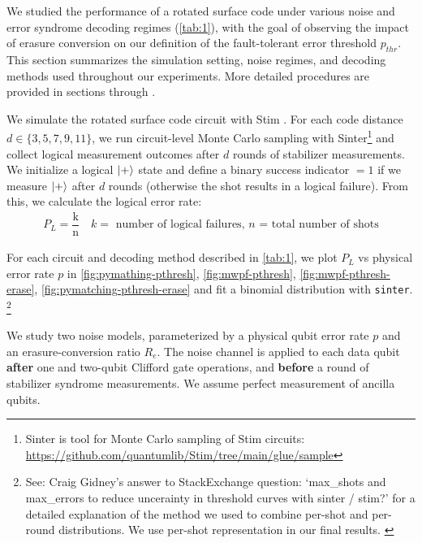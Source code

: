 \documentclass[11pt, notitlepage, letterpaper]{article}
\begin{document}
We studied the performance of a rotated surface code under various noise and error syndrome decoding regimes (\autoref{tab:1}), with the goal of observing the impact of erasure conversion on our definition of the fault-tolerant error threshold $p_{thr}$. This section summarizes the simulation setting, noise regimes, and decoding methods used throughout our experiments. More detailed procedures are provided in sections  through .

We simulate the rotated surface code circuit with Stim \cite{gidney_stim_2021}. For each code distance $d \in \{3,5,7,9,11\}$, we run circuit-level Monte Carlo sampling with Sinter\footnote{Sinter is tool for Monte Carlo sampling of Stim circuits: \href{https://github.com/quantumlib/Stim/tree/main/glue/sample}{https://github.com/quantumlib/Stim/tree/main/glue/sample}} and collect logical measurement outcomes after $d$ rounds of stabilizer measurements. We initialize a logical $\ket{+}$ state and define a binary success indicator $=1$ if we measure $\ket{+}$ after $d$ rounds (otherwise the shot results in a logical failure). From this, we calculate the logical error rate:
\begin{align}P_L = \dfrac{\text{k}}{\text{n}} \quad \text{$k=$ number of logical failures, $n$ = total number of shots}
\end{align}

For each circuit and decoding method described in \autoref{tab:1}, we plot $P_L$ vs physical error rate $p$ in \autoref{fig:pymathing-pthresh}, \autoref{fig:mwpf-pthresh}, \autoref{fig:mwpf-pthresh-erase}, \autoref{fig:pymatching-pthresh-erase} and fit a binomial distribution with \verb|sinter|. \footnote{See: Craig Gidney's answer to StackExchange question: `max\_shots and max\_errors to reduce uncerainty in threshold
    curves with sinter / stim?' for a detailed explanation of the method we used to combine per-shot and per-round distributions. We use per-shot representation in our final results. \cite{gidney_answer_2023}}

We study two noise models, parameterized by a physical qubit error rate $p$ and an erasure-conversion ratio $R_e$. The noise channel is applied to each data qubit \textbf{after} one and two-qubit Clifford gate operations, and \textbf{before} a round of stabilizer syndrome measurements. We assume perfect measurement of ancilla qubits.
\end{document}

